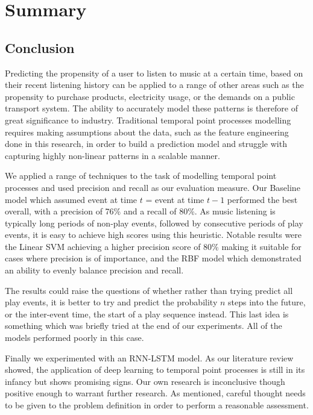 
\chapter{Summary} %

\label{Chapter6} 

\section{Conclusion}

Predicting the propensity of a user to listen to music at a certain time, based on their recent listening history can be applied to a range of other areas such as the propensity to purchase products, electricity usage, or the demands on a public transport system. The ability to accurately model these patterns is therefore of great significance to industry. Traditional temporal point processes modelling requires making assumptions about the data, such as the feature engineering done in this research, in order to build a prediction model and struggle with capturing highly non-linear patterns in a scalable manner. 

We applied a range of techniques to the task of modelling temporal point processes and used precision and recall as our evaluation measure. Our Baseline model which assumed event at time $t$ = event at time $t-1$ performed the best overall, with a precision of 76\% and a recall of 80\%. As music listening is typically long periods of non-play events, followed by consecutive periods of play events, it is easy to achieve high scores using this heuristic. Notable results were the Linear SVM achieving a higher precision score of 80\% making it suitable for cases where precision is of importance, and the RBF model which demonstrated an ability to evenly balance precision and recall.

The results could raise the questions of whether rather than trying predict all play events, it is better to try and predict the probability $n$ steps into the future, or the inter-event time, the start of a play sequence instead. This last idea is something which was briefly tried at the end of our experiments. All of the models performed poorly in this case.

Finally we experimented with an RNN-LSTM model. As our literature review showed, the application of deep learning to temporal point processes is still in its infancy but shows promising signs. Our own research is inconclusive though positive enough to warrant further research. As mentioned, careful thought needs to be given to the problem definition in order to perform a reasonable assessment. 

